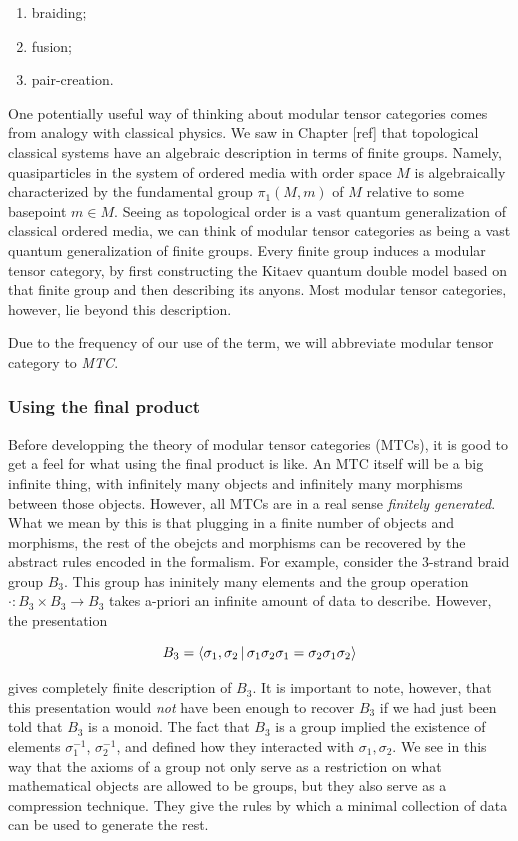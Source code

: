 \documentclass{article}
\theoremstyle{definition}
\newcommand{\0}{\left|0\right>}
\newcommand{\1}{\left|1\right>}
\numberwithin{figure}{section}
\begin{document}
\begin{enumerate}
\item braiding;
\item fusion;
\item pair-creation.
\end{enumerate}

One potentially useful way of thinking about modular tensor categories comes from analogy with classical physics. We saw in Chapter [ref] that topological classical systems have an algebraic description in terms of finite groups. Namely, quasiparticles in the system of ordered media with order space $M$ is algebraically characterized by the fundamental group $\pi_1(M,m)$ of $M$ relative to some basepoint $m\in M$. Seeing as topological order is a vast quantum generalization of classical ordered media, we can think of modular tensor categories as being a vast quantum generalization of finite groups. Every finite group induces a modular tensor category, by first constructing the Kitaev quantum double model based on that finite group and then describing its anyons. Most modular tensor categories, however, lie beyond this description.

Due to the frequency of our use of the term, we will abbreviate modular tensor category to \textit{MTC}.

\subsubsection{Using the final product}

Before developping the theory of modular tensor categories (MTCs), it is good to get a feel for what using the final product is like. An MTC itself will be a big infinite thing, with infinitely many objects and infinitely many morphisms between those objects. However, all MTCs are in a real sense \textit{finitely generated}. What we mean by this is that plugging in a finite number of objects and morphisms, the rest of the obejcts and morphisms can be recovered by the abstract rules encoded in the formalism. For example, consider the 3-strand braid group $B_3$. This group has ininitely many elements and the group operation $\cdot: B_3\times B_3\to B_3$ takes a-priori an infinite amount of data to describe. However, the presentation

$$B_3=\Braket{\sigma_1, \sigma_2 | \sigma_1 \sigma_2 \sigma_1 = \sigma_2 \sigma_1 \sigma_2}$$

gives  completely finite description of $B_3$. It is important to note, however, that this presentation would \textit{not} have been enough to recover $B_3$ if we had just been told that $B_3$ is a monoid. The fact that $B_3$ is a group implied the existence of elements $\sigma_1^{-1}$, $\sigma_{2}^{-1}$, and defined how they interacted with $\sigma_1,\sigma_2$. We see in this way that the axioms of a group not only serve as a restriction on what mathematical objects are allowed to be groups, but they also serve as a compression technique. They give the rules by which a minimal collection of data can be used to generate the rest.
\end{document}
